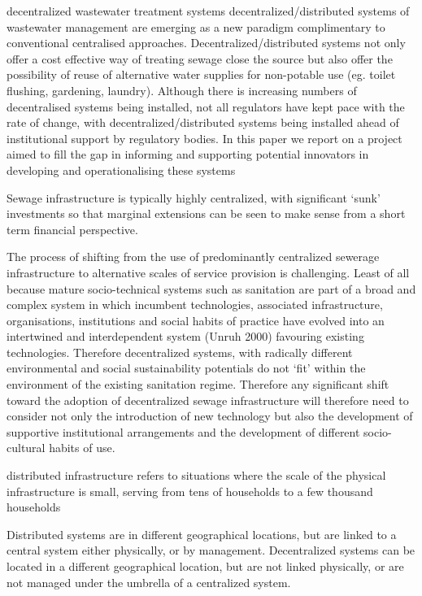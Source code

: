 decentralized wastewater treatment systems
decentralized/distributed systems of wastewater
management are emerging as a new paradigm complimentary to conventional centralised
approaches. Decentralized/distributed systems not only offer a cost effective way of treating
sewage close the source but also offer the possibility of reuse of alternative water supplies for
non-potable use (eg. toilet flushing, gardening, laundry). Although there is increasing numbers of
decentralised systems being installed, not all regulators have kept pace with the rate of change,
with decentralized/distributed systems being installed ahead of institutional support by regulatory
bodies. In this paper we report on a project aimed to fill the gap in informing and supporting
potential innovators in developing and operationalising these systems

Sewage infrastructure is typically highly centralized, with significant ‘sunk’ investments so that
marginal extensions can be seen to make sense from a short term financial perspective.

The process of shifting from the use of predominantly centralized sewerage infrastructure to
alternative scales of service provision is challenging. Least of all because mature socio-technical
systems such as sanitation are part of a broad and complex system in which incumbent
technologies, associated infrastructure, organisations, institutions and social habits of practice
have evolved into an intertwined and interdependent system (Unruh 2000) favouring existing
technologies. Therefore decentralized systems, with radically different environmental and social
sustainability potentials do not ‘fit’ within the environment of the existing sanitation regime.
Therefore any significant shift toward the adoption of decentralized sewage infrastructure will
therefore need to consider not only the introduction of new technology but also the development
of supportive institutional arrangements and the development of different socio-cultural habits of
use.

distributed infrastructure refers to situations where the scale of the physical
infrastructure is small, serving from tens of households to a few thousand households

Distributed systems are in different geographical locations, but are linked to a central system either physically, or by management.
Decentralized systems can be located in a different geographical location, but are not linked physically, or are not managed under the umbrella of a centralized system.


